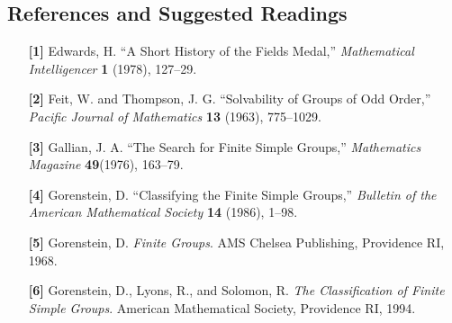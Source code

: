  
 
\subsection*{References and Suggested Readings}  %
 
 
{\small
\begin{itemize}
 
\item[\textbf{[1]}]
Edwards, H. ``A Short History of the Fields Medal,'' {\it
Mathematical Intelligencer} \textbf{1} (1978), 127--29.
 
\item[\textbf{[2]}]
Feit, W. and Thompson, J. G. ``Solvability of Groups of Odd
Order,'' \textit{Pacific Journal of Mathematics} \textbf{
13} (1963), 775--1029.
 
\item[\textbf{[3]}]
Gallian, J. A. ``The Search for Finite Simple Groups,''
\textit{Mathematics Magazine} \textbf{49}(1976), 163--79.
 
\item[\textbf{[4]}]
Gorenstein, D. ``Classifying the Finite Simple Groups,''
\textit{Bulletin of the American Mathematical Society} \textbf{
14} (1986), 1--98.
 
\item[\textbf{[5]}]
Gorenstein, D. \textit{Finite Groups}. AMS Chelsea Publishing, Providence RI, 1968.

\item[\textbf{[6]}]
Gorenstein, D., Lyons, R., and Solomon, R. \textit{The Classification of Finite Simple
Groups}.
American Mathematical Society, Providence RI, 1994.
 
\end{itemize}
}
 
\sagesection
 
